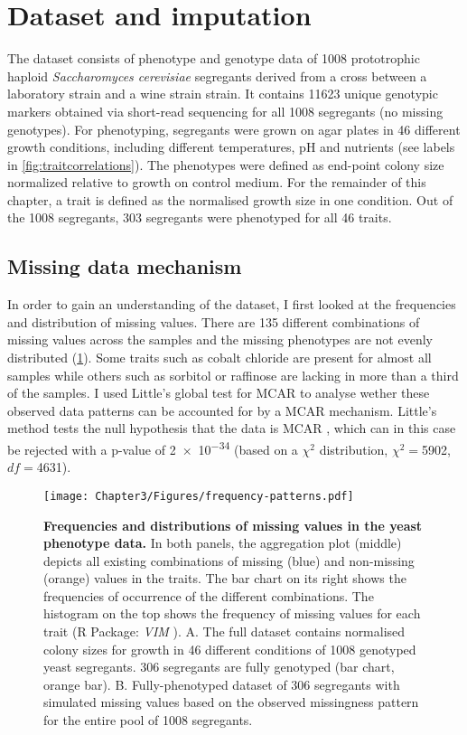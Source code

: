 \section{Dataset and imputation}
The dataset consists of phenotype and genotype data of \num{1008} prototrophic haploid \emph{Saccharomyces cerevisiae} segregants derived from a cross between a laboratory strain and a wine strain strain. It contains \num{11623} unique genotypic markers obtained via short-read sequencing for all \num{1008} segregants (no missing genotypes). For phenotyping, segregants were grown on agar plates in \num{46} different growth conditions, including different temperatures, pH and nutrients (see labels in \cref{fig:traitcorrelations}). The phenotypes were defined as end-point colony size normalized relative to growth on control medium. For the remainder of this chapter, a trait is defined as the normalised growth size in one condition. Out of the \num{1008} segregants, \num{303} segregants were phenotyped for all \num{46} traits.

\subsection{Missing data mechanism} 
In order to gain an understanding of the dataset, I first looked at the frequencies and distribution of missing values. There are \num{135} different combinations of missing values across the samples and the missing phenotypes are not evenly distributed (\cref{fig:missingness}). Some traits such as cobalt chloride are present for almost all samples while others such as sorbitol or raffinose are lacking in more than a third of the samples. I used Little's global test for MCAR to analyse wether these observed data patterns can be accounted for by a MCAR mechanism. Little's method tests the null hypothesis that the data is MCAR \citep{Little1988,Beaujean2015}, which can in this case be rejected with a p-value of \num{2e-34} (based on a \(\chi^2\) distribution, \(\chi^2=\)\num{5902}, \(df=\)\num{4631}). 

\begin{figure}[p]
	\centering
	\texttt{[image: Chapter3/Figures/frequency-patterns.pdf]}
	\caption[\textbf{Frequencies and distributions of missing values in the yeast phenotype data.} Generated via R function \textit{VIM::aggr}]{\textbf{Frequencies and distributions of missing values in the yeast phenotype data. }In both panels, the aggregation plot (middle) depicts all existing combinations of missing (blue) and non-missing (orange) values in the traits. The bar chart on its right shows the frequencies of occurrence of the different combinations. The histogram on the top shows the frequency of missing values for each trait (R Package: \emph{VIM} \citep{Templ2012}). A. The full dataset contains normalised colony sizes for growth in \num{46} different conditions of \num{1008} genotyped yeast segregants. \num{306} segregants are fully genotyped (bar chart, orange bar). B. Fully-phenotyped dataset of \num{306} segregants with simulated missing values based on the observed missingness pattern for the entire pool of \num{1008} segregants.}
 	\label{fig:missingness}
\end{figure}

